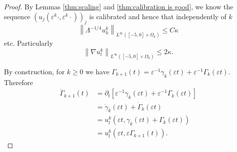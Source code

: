 \documentclass[11pt]{amsart}
\theoremstyle{remark}
\theoremstyle{definition}
\newcommand{\eps}{\varepsilon}
\newcommand{\norm}[1]{\left\lVert#1\right\rVert}
\newcommand{\bracket}[1]{\left[ #1 \right]}
\newcommand{\del}{\partial}
\newcommand{\grad}{\nabla}
\newcommand{\n}{^{-1}}
\newcommand{\ulow}{u_l}
\newcommand{\uhigh}{u_h}
\newcommand{\ulowth}[1]{\ulow^{#1}}
\newcommand{\uhighth}[1]{\uhigh^{#1}}
\begin{document}
\begin{proof}
By Lemmas \ref{thm:scaling} and \ref{thm:calibration is good}, we know the sequence $(u_j(\eps^k \cdot, \eps^k \cdot))_j$ is calibrated and hence that independently of $k$
\[ \norm{\Lambda^{-1/4} \uhighth{k}}_{L^\infty([-5,0]\times \Omega_k)} \leq C \kappa \]
etc.  
Particularly
\[ \norm{\grad \ulowth{k}}_{L^\infty([-5,0]\times \Omega_k)} \leq 2 \kappa. \]


By construction, for $k \geq 0$ we have $\Gamma_{k+1}(t) = \eps\n \gamma_k(\eps t) + \eps\n \Gamma_k(\eps t)$.  Therefore
\begin{align*} 
\dot{\Gamma}_{k+1}(t) &= \del_t \bracket{\eps\n \gamma_k(\eps t) + \eps\n \Gamma_k(\eps t)}
\\ &= \dot{\gamma}_k(\eps t) + \dot{\Gamma}_k(\eps t)
\\ &= \ulowth{k}(\eps t, \gamma_k(\eps t) + \Gamma_k(\eps t))
\\ &= \ulowth{k}(\eps t, \eps \Gamma_{k+1}(t)).  
\end{align*}

%


\end{proof}
\end{document}
